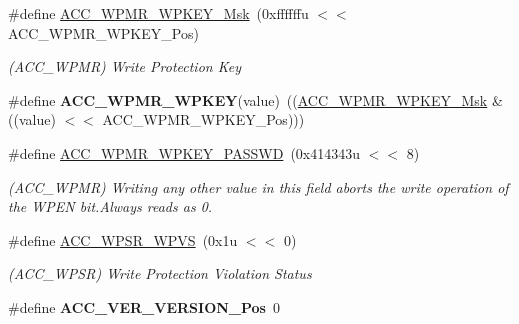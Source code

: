 \begin{DoxyCompactItemize}
\item 
\mbox{\label{group__SAMV71__ACC_ga9aa68668a3abab5758d5804e187ead84}} 
\#define \mbox{\hyperlink{group__SAMV71__ACC_ga9aa68668a3abab5758d5804e187ead84}{A\+C\+C\+\_\+\+W\+P\+M\+R\+\_\+\+W\+P\+K\+E\+Y\+\_\+\+Msk}}~(0xffffffu $<$$<$ A\+C\+C\+\_\+\+W\+P\+M\+R\+\_\+\+W\+P\+K\+E\+Y\+\_\+\+Pos)
\begin{DoxyCompactList}\small\item\em (A\+C\+C\+\_\+\+W\+P\+MR) Write Protection Key \end{DoxyCompactList}\item 
\mbox{\label{group__SAMV71__ACC_gac6c700f13c611085e645287fa076b5c4}} 
\#define {\bfseries A\+C\+C\+\_\+\+W\+P\+M\+R\+\_\+\+W\+P\+K\+EY}(value)~((\mbox{\hyperlink{group__SAMV71__ACC_ga9aa68668a3abab5758d5804e187ead84}{A\+C\+C\+\_\+\+W\+P\+M\+R\+\_\+\+W\+P\+K\+E\+Y\+\_\+\+Msk}} \& ((value) $<$$<$ A\+C\+C\+\_\+\+W\+P\+M\+R\+\_\+\+W\+P\+K\+E\+Y\+\_\+\+Pos)))
\item 
\mbox{\label{group__SAMV71__ACC_gaf8b3dd7f74ad28d3383ded796e90fb37}} 
\#define \mbox{\hyperlink{group__SAMV71__ACC_gaf8b3dd7f74ad28d3383ded796e90fb37}{A\+C\+C\+\_\+\+W\+P\+M\+R\+\_\+\+W\+P\+K\+E\+Y\+\_\+\+P\+A\+S\+S\+WD}}~(0x414343u $<$$<$ 8)
\begin{DoxyCompactList}\small\item\em (A\+C\+C\+\_\+\+W\+P\+MR) Writing any other value in this field aborts the write operation of the W\+P\+EN bit.\+Always reads as 0. \end{DoxyCompactList}\item 
\mbox{\label{group__SAMV71__ACC_gac5b5501d42101656c07ce85841fbef24}} 
\#define \mbox{\hyperlink{group__SAMV71__ACC_gac5b5501d42101656c07ce85841fbef24}{A\+C\+C\+\_\+\+W\+P\+S\+R\+\_\+\+W\+P\+VS}}~(0x1u $<$$<$ 0)
\begin{DoxyCompactList}\small\item\em (A\+C\+C\+\_\+\+W\+P\+SR) Write Protection Violation Status \end{DoxyCompactList}\item 
\mbox{\label{group__SAMV71__ACC_gadd1628d07b1b66822d78756cc9065232}} 
\#define {\bfseries A\+C\+C\+\_\+\+V\+E\+R\+\_\+\+V\+E\+R\+S\+I\+O\+N\+\_\+\+Pos}~0
\item 

\end{DoxyCompactItemize}
